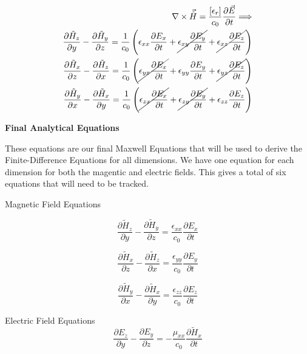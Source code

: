 \documentclass[a4paper,10pt]{article}
\begin{document}
\begin{align}
  \nabla \times \vec{\tilde{H}} =  \frac{[\epsilon_r]}{c_0}\frac{\partial \vec{E}}{\partial t}
  \Longrightarrow\\
  \frac{\partial \tilde{H}_z}{\partial y} - \frac{\partial \tilde{H}_y}{\partial z} = \frac{1}{c_0}\left(\epsilon_{xx} \frac{\partial E_x}{\partial t} + \cancel{\epsilon_{xy} \frac{\partial E_y}{\partial t}} + \cancel{\epsilon_{xz} \frac{\partial E_z}{\partial t}}\right)\notag\\
  \frac{\partial \tilde{H}_x}{\partial z} - \frac{\partial \tilde{H}_z}{\partial x} = \frac{1}{c_0}\left(\cancel{\epsilon_{yx} \frac{\partial E_x}{\partial t}} + \epsilon_{yy} \frac{\partial E_y}{\partial t} + \cancel{\epsilon_{yz} \frac{\partial E_z}{\partial t}}\right)\notag\\
  \frac{\partial \tilde{H}_y}{\partial x} - \frac{\partial \tilde{H}_x}{\partial y} = \frac{1}{c_0}\left(\cancel{\epsilon_{zx} \frac{\partial E_x}{\partial t}} + \cancel{\epsilon_{zy} \frac{\partial E_y}{\partial t}} + \epsilon_{zz} \frac{\partial E_z}{\partial t}\right)\notag
\end{align}

\textbf{Final Analytical Equations}

These equations are our final Maxwell Equations that will be used to derive the Finite-Difference Equations for all dimensions.  We have one equation for each dimension for both the magentic and electric fields.  This gives a total of six equations that will need to be tracked.


Magnetic Field Equations

\begin{equation}
  \frac{\partial \tilde{H}_z}{\partial y} - \frac{\partial \tilde{H}_y}{\partial z} = \frac{\epsilon_{xx}}{c_0}\frac{\partial E_x}{\partial t}
\end{equation}

\begin{equation}
  \frac{\partial \tilde{H}_x}{\partial z} - \frac{\partial \tilde{H}_z}{\partial x} = \frac{\epsilon_{yy}}{c_0}\frac{\partial E_y}{\partial t}
\end{equation}

\begin{equation}
  \frac{\partial \tilde{H}_y}{\partial x} - \frac{\partial \tilde{H}_x}{\partial y} = \frac{\epsilon_{zz} }{c_0}\frac{\partial E_z}{\partial t}
\end{equation}

Electric Field Equations
\begin{equation}
  \frac{\partial E_z}{\partial y} - \frac{\partial E_y}{\partial z} = -\frac{\mu_{xx}}{c_0}\frac{\partial\tilde{H}_x}{\partial t}
\end{equation}
\end{document}
